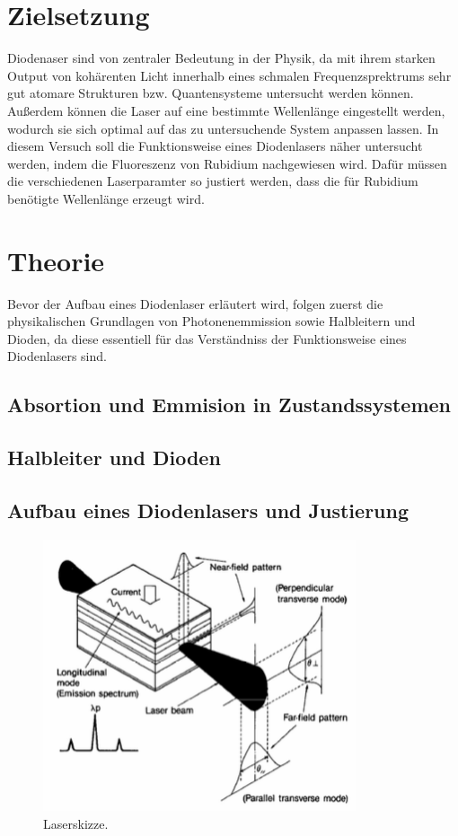 \section{Zielsetzung}
\label{sec:Zielsetzung}
Diodenaser sind von zentraler Bedeutung in der Physik, da mit ihrem starken Output von kohärenten
Licht innerhalb eines schmalen Frequenzsprektrums sehr gut atomare Strukturen bzw. Quantensysteme
untersucht werden können. Außerdem können die Laser auf eine bestimmte Wellenlänge eingestellt werden, 
wodurch sie sich optimal auf das zu untersuchende System anpassen lassen.
In diesem Versuch soll die Funktionsweise eines Diodenlasers näher untersucht werden, indem die
Fluoreszenz von Rubidium nachgewiesen wird. Dafür müssen die verschiedenen Laserparamter so justiert werden,
dass die für Rubidium benötigte Wellenlänge erzeugt wird.

\section{Theorie}
\label{sec:Theorie}

Bevor der Aufbau eines Diodenlaser erläutert wird, folgen zuerst die physikalischen Grundlagen von Photonenemmission
sowie Halbleitern und Dioden, da diese essentiell für das Verständniss der Funktionsweise eines Diodenlasers sind.

\subsection{Absortion und Emmision in Zustandssystemen}

\subsection{Halbleiter und Dioden}

\subsection{Aufbau eines Diodenlasers und Justierung}

\begin{figure}[H]
    \centering
    \includegraphics[height=8cm]{content/pics/laser.png}
    \caption{Laserskizze. \cite{V60}}
    \label{fig:laser}
\end{figure}

